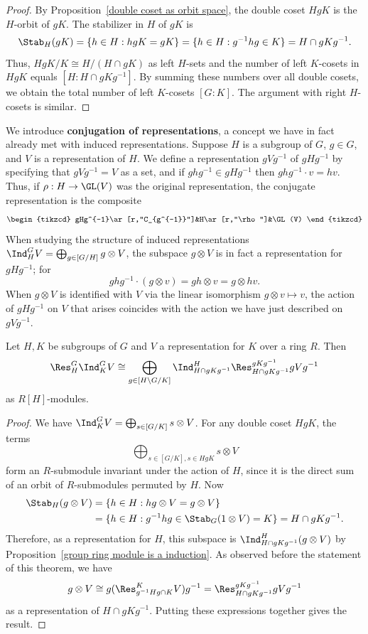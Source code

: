 \begin{proof}
By Proposition~\ref{double coset as orbit space}, the double coset $HgK$ is the $H$-orbit of $gK$. The stabilizer in $H$ of $gK$ is
\[\Stab_{H}(gK)=\{h\in H:hgK=gK\}=\{h\in H:g^{-1}hg\in K\}=H\cap gKg^{-1}.\]
Thus, $HgK/K\cong H/(H\cap gK)$ as left $H$-sets and the number of left $K$-cosets in $HgK$ equals $[H:H\cap gKg^{-1}]$. By summing these numbers over all double cosets, we obtain the total number of left $K$-cosets $[G:K]$. The argument with right $H$-cosets is similar.
\end{proof}
We introduce \textbf{conjugation of representations}, a concept we have in fact already met with induced representations. Suppose $H$ is a subgroup of $G$, $g\in G$, and $V$ is a representation of $H$. We define a representation $gVg^{-1}$ of $gHg^{-1}$ by specifying that $gVg^{-1}=V$ as a set, and if $ghg^{-1}\in gHg^{-1}$ then $ghg^{-1}\cdot v=hv$. Thus, if $\rho:H\to\GL(V)$ was the original representation, the conjugate representation is the composite
\[\begin{tikzcd}
gHg^{-1}\ar[r,"C_{g^{-1}}"]&H\ar[r,"\rho"]&\GL(V)
\end{tikzcd}\]
When studying the structure of induced representations $\Ind^G_HV=\bigoplus_{g\in[G/H]}g\otimes V$, the subspace $g\otimes V$ is in fact a representation for $gHg^{-1}$; for
\[ghg^{-1}\cdot(g\otimes v)=gh\otimes v=g\otimes hv.\]
When $g\otimes V$ is identified with $V$ via the linear isomorphism $g\otimes v\mapsto v$, the action of $gHg^{-1}$ on $V$ that arises coincides with the action we have just described on $gVg^{-1}$.
\begin{theorem}
Let $H,K$ be subgroups of $G$ and $V$ a representation for $K$ over a ring $R$. Then
\[\Res^G_H\Ind^G_KV\cong\bigoplus_{g\in[H\backslash G/K]}\Ind^H_{H\cap gKg^{-1}}\Res^{gKg^{-1}}_{H\cap gKg^{-1}}gVg^{-1}\]
as $R[H]$-modules.
\end{theorem}
\begin{proof}
We have $\Ind^G_KV=\bigoplus_{s\in[G/K]}s\otimes V$. For any double coset $HgK$, the terms
\[\bigoplus_{s\in[G/K],s\in HgK}s\otimes V\]
form an $R$-submodule invariant under the action of $H$, since it is the direct sum of an orbit of $R$-submodules permuted by $H$. Now
\begin{align*}
\Stab_H(g\otimes V)&=\{h\in H:hg\otimes V=g\otimes V\}\\
&=\{h\in H:g^{-1}hg\in\Stab_{G}(1\otimes V)=K\}=H\cap gKg^{-1}.
\end{align*}
Therefore, as a representation for $H$, this subspace is $\Ind^H_{H\cap gKg^{-1}}(g\otimes V)$ by Proposition~\ref{group ring module is a induction}. As observed before the statement of this theorem, we have \[g\otimes V\cong g(\Res^K_{g^{-1}Hg\cap K}V)g^{-1}=\Res^{gKg^{-1}}_{H\cap gKg^{-1}}gVg^{-1}\]
as a representation of $H\cap gKg^{-1}$. Putting these expressions together
gives the result.
\end{proof}
